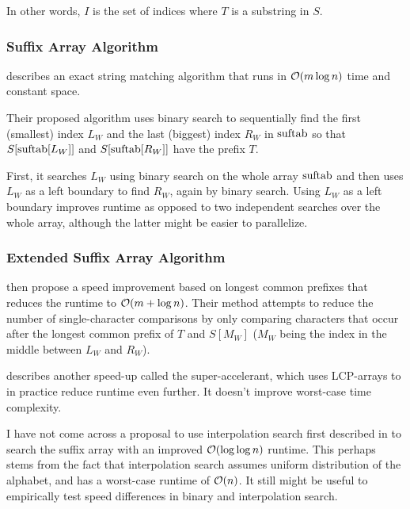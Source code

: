 \documentclass[a4paper,10pt]{article}
\begin{document}
In other words, $I$ is the set of indices where $T$ is a substring in $S$.

\subsubsection*{Suffix Array Algorithm}

\citealt{manber1993suffix} describes an exact string matching algorithm
that runs in ${\cal{O}}(m \log n)$ time and constant space.

Their proposed algorithm uses binary search to sequentially find
the first (smallest) index $L_{W}$ and the last (biggest) index
$R_{W}$ in $\hbox{suftab}$ so that $S[\hbox{suftab}[L_{W}]]$ and
$S[\hbox{suftab}[R_{W}]]$ have the prefix $T$.

First, it searches $L_{W}$ using binary search on the whole array
$\hbox{suftab}$ and then uses $L_{W}$ as a left boundary to find $R_{W}$,
again by binary search.  Using $L_{W}$ as a left boundary improves
runtime as opposed to two independent searches over the whole array,
although the latter might be easier to parallelize.

\subsubsection*{Extended Suffix Array Algorithm}

\citealt{manber1993suffix} then propose a speed improvement based on
longest common prefixes that reduces the runtime to ${\cal{O}}(m + \log
n)$. Their method attempts to reduce the number of single-character
comparisons by only comparing characters that occur after the longest
common prefix of $T$ and $S[M_{W}]$ ($M_{W}$ being the index in the
middle between $L_{W}$ and $R_{W}$).

\citealt[p. 152]{gusfield1997algorithms} describes another speed-up
called the super-accelerant, which uses LCP-arrays to in practice reduce
runtime even further. It doesn't improve worst-case time complexity.


I have not come across a proposal to use interpolation search first
described in \citealt{perl1978interpolation} to search the suffix array
with an improved ${\cal{O}}(\log \log n)$ runtime. This perhaps stems
from the fact that interpolation search assumes uniform distribution of
the alphabet, and has a worst-case runtime of ${\cal{O}}(n)$. It still
might be useful to empirically test speed differences in binary and
interpolation search.
\end{document}

